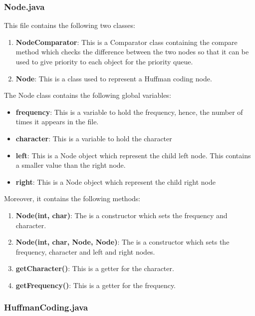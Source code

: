 \documentclass{article}
\begin{document}
				\subsubsection{Node.java}
		
		This file contains the following two classes:
		\begin{enumerate}
			\item \textbf{NodeComparator}: This is a Comparator class containing the compare method which checks the difference between the two nodes so that it can be used to give priority to each object for the priority queue.
			\item \textbf{Node}: This is a class used to represent a Huffman coding node. 
		\end{enumerate}
		
		The Node class contains the following global variables:
		\begin{itemize}
			\item \textbf{frequency}: This is a variable to hold the frequency, hence, the number of times it appears in the file.
			\item \textbf{character}: This is a variable to hold the character
			\item \textbf{left}: This is a Node object which represent the child left node. This contains a smaller value than the right node.
			\item \textbf{right}: This is a Node object which represent the child right node
		\end{itemize}
		
		Moreover, it contains the following methods: 
		
		\begin{enumerate}
		\item \textbf{Node(int, char)}: The is a constructor which sets the frequency and character.
		\item \textbf{Node(int, char, Node, Node)}: The is a constructor which sets the frequency, character and left and right nodes.
		\item \textbf{getCharacter()}: This is a getter for the character.
		\item \textbf{getFrequency()}: This is a getter for the frequency.
		\end{enumerate}
		
		
		\subsubsection{HuffmanCoding.java}
		
\end{document}

